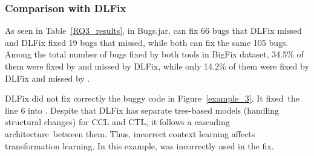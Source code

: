 \subsubsection{\bf Comparison with DLFix}

As seen in Table~\ref{RQ3_results}, in Bugs.jar, {\tool} can fix 66
bugs that DLFix missed and DLFix fixed 19 bugs that {\tool}
missed, while both can fix the same 105 bugs. Among the total
number of bugs fixed by both tools in BigFix dataset, 34.5\% of them
were fixed by {\tool} and missed by DLFix, while only 14.2\% of them
were fixed by DLFix and missed by {\tool}.

DLFix did not fix correctly the buggy code in
Figure~\ref{example_3}. It fixed~the line 6 into    \code{\%}
. Despite that DLFix has separate tree-based models
(handling structural changes) for CCL and CTL,
it follows a cascading architecture~between them.
Thus, incorrect context learning affects transformation
learning. In this example,  was incorrectly used in the
fix.













